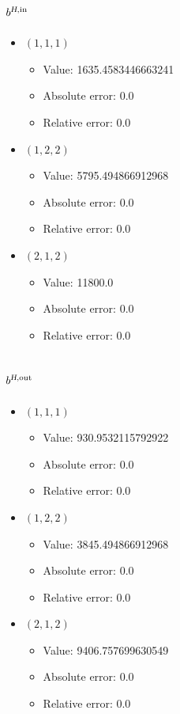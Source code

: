 \documentclass{article}%
\begin{document}
\subsection{$b^{\textsl{H},\text{in}}$}%
\begin{itemize}%
	\item $(1, 1, 1)$%
	\begin{itemize}%
		\item Value: 1635.4583446663241%
		\item Absolute error: 0.0%
		\item Relative error: 0.0%
	\end{itemize}%
	\item $(1, 2, 2)$%
	\begin{itemize}%
		\item Value: 5795.494866912968%
		\item Absolute error: 0.0%
		\item Relative error: 0.0%
	\end{itemize}%
	\item $(2, 1, 2)$%
	\begin{itemize}%
		\item Value: 11800.0%
		\item Absolute error: 0.0%
		\item Relative error: 0.0%
	\end{itemize}%
\end{itemize}%
\subsection{$b^{\textsl{H},\text{out}}$}%
\begin{itemize}%
	\item $(1, 1, 1)$%
	\begin{itemize}%
		\item Value: 930.9532115792922%
		\item Absolute error: 0.0%
		\item Relative error: 0.0%
	\end{itemize}%
	\item $(1, 2, 2)$%
	\begin{itemize}%
		\item Value: 3845.494866912968%
		\item Absolute error: 0.0%
		\item Relative error: 0.0%
	\end{itemize}%
	\item $(2, 1, 2)$%
	\begin{itemize}%
		\item Value: 9406.757699630549%
		\item Absolute error: 0.0%
		\item Relative error: 0.0%
	\end{itemize}%
\end{itemize}%
\end{document}
